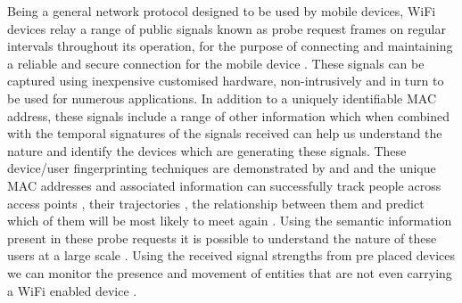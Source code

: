 Being a general network protocol designed to be used by mobile devices, WiFi devices relay a range of public signals known as probe request frames on regular intervals throughout its operation, for the purpose of connecting and maintaining a reliable and secure connection for the mobile device \citep{freud2015}.
These signals can be captured using inexpensive customised hardware, non-intrusively and in turn to be used for numerous applications.
In addition to a uniquely identifiable MAC address, these signals include a range of other information which when combined with the temporal signatures of the signals received can help us understand the nature and identify the devices which are generating these signals.
These device/user fingerprinting techniques are demonstrated by \citep{franklin2006} and \citep{pang2007} and the unique MAC addresses and associated information can successfully track people across access points \citep{cunche2014a}, their trajectories \citep{musa2012}, the relationship between them \citep{cheng2012, barbera2013, cunche2014} and predict which of them will be most likely to meet again \citep{cunche2012}.
Using the semantic information present in these probe requests it is possible to understand the nature of these users at a large scale \citep{di2016}.
Using the received signal strengths from pre placed devices we can monitor the presence and movement of entities that are not even carrying a WiFi enabled device \citep{elgohary2013}.

